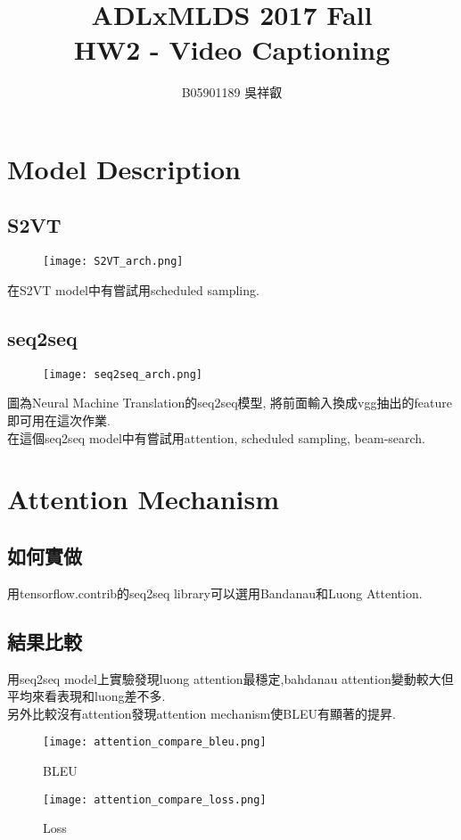 \documentclass[12pt, a4paper]{article}
\title{ADLxMLDS 2017 Fall\\HW2 - Video Captioning}
\author{B05901189 吳祥叡}
\begin{document}
	{\let\newpage\relax\maketitle}
	\section{Model Description}
		\subsection{S2VT}
			\begin{figure}[h!]
				\texttt{[image: S2VT\_arch.png]}
			\end{figure}
			在S2VT model中有嘗試用scheduled sampling.
		\subsection{seq2seq}		
			\begin{figure}[h!]
				\texttt{[image: seq2seq\_arch.png]}
			\end{figure}
			圖為Neural Machine Translation的seq2seq模型, 將前面輸入換成vgg抽出的feature即可用在這次作業.\\
			在這個seq2seq model中有嘗試用attention, scheduled sampling, beam-search.
	\section{Attention Mechanism}
		\subsection{如何實做}
			用tensorflow.contrib的seq2seq library可以選用Bandanau和Luong Attention.
		\subsection{結果比較}
		 用seq2seq model上實驗發現luong attention最穩定,bahdanau attention變動較大但平均來看表現和luong差不多. \\
		 另外比較沒有attention發現attention mechanism使BLEU有顯著的提昇.
		 \begin{figure}[ht]
		 	\begin{minipage}[b]{0.5\linewidth}
		 		\centering
		 		\texttt{[image: attention\_compare\_bleu.png]}
		 		\caption{BLEU}
		 		\label{fig:figure1}
		 	\end{minipage}
		 	\hspace{0.5cm}
		 	\begin{minipage}[b]{0.5\linewidth}
		 		\centering
		 		\texttt{[image: attention\_compare\_loss.png]}
		 		\caption{Loss}
		 		\label{fig:figure2}
		 	\end{minipage}
		 \end{figure}
\end{document}
